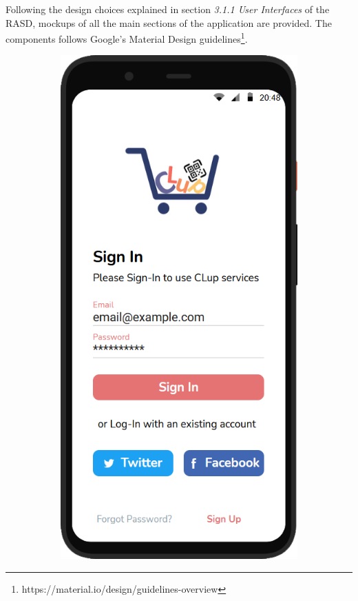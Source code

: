 Following the design choices explained in section \textit{3.1.1  User Interfaces} of the RASD, mockups of all the main sections of the application are provided. The components follows Google's Material Design guidelines\footnote{https://material.io/design/guidelines-overview}.

\begin{figure}[H]
    \vspace{4cm}

    \begin{subfigure}{.33\textwidth}
        \centering
        \includegraphics[width=.95\linewidth]{Images/screen_01.png}

\end{subfigure}
\end{figure}
